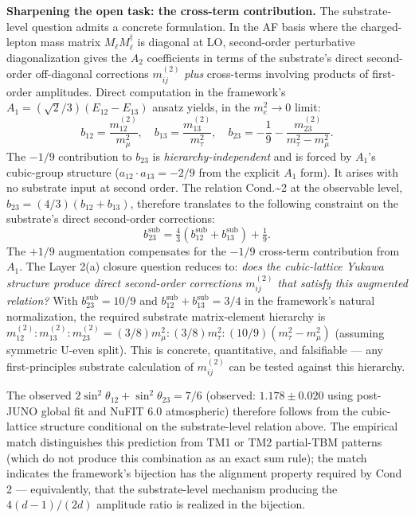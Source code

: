 \documentclass[
]{article}
\begin{document}
\textbf{Sharpening the open task: the cross-term contribution.} The
substrate-level question admits a concrete formulation. In the AF basis
where the charged-lepton mass matrix \(M_\ell M_\ell^\dagger\) is
diagonal at LO, second-order perturbative diagonalization gives the
\(A_2\) coefficients in terms of the substrate's direct second-order
off-diagonal corrections \(m_{ij}^{(2)}\) \emph{plus} cross-terms
involving products of first-order amplitudes. Direct computation in the
framework's \(A_1 = (\sqrt{2}/3)(E_{12}-E_{13})\) ansatz yields, in the
\(m_e^2 \to 0\) limit:
\[b_{12} = \frac{m_{12}^{(2)}}{m_\mu^2}, \quad b_{13} = \frac{m_{13}^{(2)}}{m_\tau^2}, \quad b_{23} = -\frac{1}{9} - \frac{m_{23}^{(2)}}{m_\tau^2 - m_\mu^2}.\]
The \(-1/9\) contribution to \(b_{23}\) is \emph{hierarchy-independent}
and is forced by \(A_1\)'s cubic-group structure
(\(a_{12}\cdot a_{13} = -2/9\) from the explicit \(A_1\) form). It
arises with no substrate input at second order. The relation
Cond.\textasciitilde2 at the observable level,
\(b_{23} = (4/3)(b_{12}+b_{13})\), therefore translates to the following
constraint on the substrate's direct second-order corrections:
\[b_{23}^{\text{sub}} = \tfrac{4}{3}(b_{12}^{\text{sub}} + b_{13}^{\text{sub}}) + \tfrac{1}{9}.\]
The \(+1/9\) augmentation compensates for the \(-1/9\) cross-term
contribution from \(A_1\). The Layer 2(a) closure question reduces to:
\emph{does the cubic-lattice Yukawa structure produce direct
second-order corrections \(m_{ij}^{(2)}\) that satisfy this augmented
relation?} With \(b_{23}^{\text{sub}} = 10/9\) and
\(b_{12}^{\text{sub}} + b_{13}^{\text{sub}} = 3/4\) in the framework's
natural normalization, the required substrate matrix-element hierarchy
is
\(m_{12}^{(2)} : m_{13}^{(2)} : m_{23}^{(2)} = (3/8)m_\mu^2 : (3/8)m_\tau^2 : (10/9)(m_\tau^2 - m_\mu^2)\)
(assuming symmetric U-even split). This is concrete, quantitative, and
falsifiable --- any first-principles substrate calculation of
\(m_{ij}^{(2)}\) can be tested against this hierarchy.

The observed \(2\sin^2\theta_{12} + \sin^2\theta_{23} = 7/6\) (observed:
\(1.178 \pm 0.020\) using post-JUNO global fit and NuFIT 6.0
atmospheric) therefore follows from the cubic-lattice structure
conditional on the substrate-level relation above. The empirical match
distinguishes this prediction from TM1 or TM2 partial-TBM patterns
(which do not produce this combination as an exact sum rule); the match
indicates the framework's bijection has the alignment property required
by Cond 2 --- equivalently, that the substrate-level mechanism producing
the \(4(d-1)/(2d)\) amplitude ratio is realized in the bijection.
\end{document}
